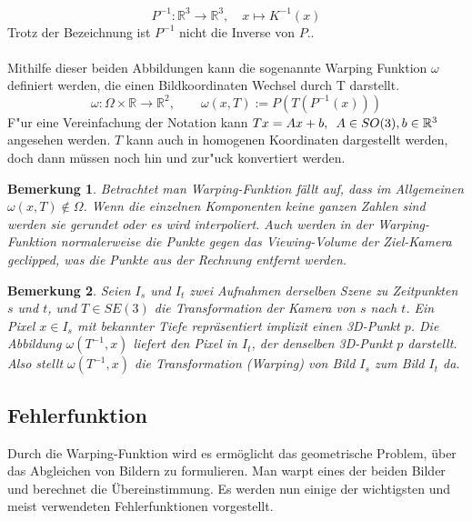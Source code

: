 \documentclass[12pt,DIV=15,BCOR=15mm,twoside,headsepline,abstract=true,listof=totoc,bibliography=totoc]{scrreprt}
\newtheorem{remark}{Bemerkung}[chapter]
\theoremstyle{remark}    %
\begin{document}
    \[ P^{-1}: \mathbb{R}^3 \to \mathbb{R}^3, \hspace{1em} x \mapsto K^{-1}(x)\] 
    Trotz der Bezeichnung ist $P^{-1}$ nicht die Inverse von $P$.\cite{djema2023densevisualodometryusing}.\\\\
    Mithilfe dieser beiden Abbildungen kann die sogenannte  Warping Funktion $\omega$ definiert werden, die einen Bildkoordinaten Wechsel
    durch T darstellt.
    \[
        \omega: \Omega \times \mathbb{R} \to \mathbb{R}^2, \hspace{2em} \omega (x,T) := P(T(P^{-1}(x)))
    \]
    F"ur eine Vereinfachung der Notation kann $Tx = Ax + b, \hspace{0.5em} A \in SO(3), b \in \mathbb{R}^3$ angesehen werden.
    $T$ kann auch in homogenen Koordinaten dargestellt werden, doch dann müssen noch hin und zur"uck konvertiert werden.
    \begin{remark}
        Betrachtet man Warping-Funktion fällt auf, dass im Allgemeinen $\omega(x,T) \notin \Omega$.
        Wenn die einzelnen Komponenten keine ganzen Zahlen sind werden sie gerundet oder es wird interpoliert. Auch werden in der Warping-Funktion
        normalerweise die Punkte gegen das Viewing-Volume der Ziel-Kamera geclipped, was die Punkte aus der Rechnung entfernt werden.
    \end{remark}
    \begin{remark}
        Seien $I_s$ und $I_t$ zwei Aufnahmen derselben Szene zu Zeitpunkten $s$ und $t$, 
        und $T \in SE(3)$ die Transformation der Kamera von $s$ nach $t$. Ein Pixel $x \in I_s$ mit bekannter Tiefe repräsentiert implizit einen 3D-Punkt $p$. 
        Die Abbildung $\omega(T^{-1}, x)$ liefert den Pixel in $I_t$, der denselben 3D-Punkt $p$ darstellt. \\
        Also stellt $\omega(T^{-1}, x)$ die Transformation (Warping) von Bild $I_s$ zum Bild $I_t$ da.
    \end{remark}
    
    \subsection{Fehlerfunktion}
    \label{Fehlerfunktion}
    Durch die Warping-Funktion wird es ermöglicht das geometrische Problem, über das Abgleichen von Bildern zu formulieren. Man warpt eines 
    der beiden Bilder und berechnet die Übereinstimmung.
    Es werden nun einige der wichtigsten und meist verwendeten Fehlerfunktionen vorgestellt. 
\end{document}
